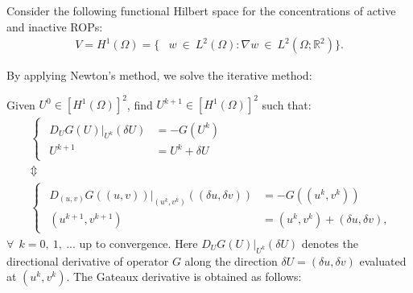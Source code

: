 Consider the following functional Hilbert space for the concentrations of active and inactive ROPs:
\begin{equation}\label{eq:hilbert}\begin{aligned}
  V = H^1\left(\Omega\right)= \{ & w \ \in \ L^2\left(\Omega\right): \nabla w \ \in \ L^2\left(\Omega; \mathds{R}^2\right) \}.
\end{aligned}\end{equation}

By applying Newton's method, we solve the iterative method:

Given $U^0 \in \left[H^1\left(\Omega\right)\right]^2$, find $U^{k+1} \in \left[H^1\left(\Omega\right)\right]^2$ such that:
\begin{equation}\label{eq:Newton}\begin{aligned}
& \left\lbrace
\begin{matrix}\begin{aligned}
D_{U} G\left(U\right)|_{U^k} \left(\delta U\right) & = - G\left(U^k\right) \\[6pt]
U^{k+1} & = U^{k} + \delta U
\end{aligned}\end{matrix}
\right.
\\ & \Updownarrow  \\
& \left\lbrace
\begin{matrix}\begin{aligned}
D_{\left(u, v\right)}G\left(\left(u, v\right)\right)|_{\left(u^k, v^k\right)} \left(\left(\delta u, \delta v\right)\right) & = - G\left(\left(u^k, v^k\right)\right)   \\[6pt]
\left(u^{k+1}, v^{k+1}\right) & = \left(u^k, v^k\right) + \left(\delta u, \delta v\right),
\end{aligned}\end{matrix}
\right.
\end{aligned}\end{equation}
$\forall \ \ k = 0,\ 1, \ ...$ up to convergence.
Here $ D_{U} G\left(U\right)|_{U^k} \left(\delta U\right) $ denotes the directional derivative of operator $G$ along the direction $\delta U = (\delta u, \delta v) $ evaluated at $(u^k, v^k)$. The Gateaux derivative is obtained as follows:
